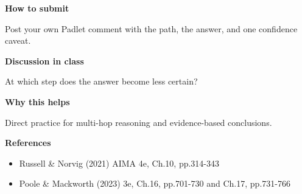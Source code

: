 \documentclass[11pt]{article}
\begin{document}
\begin{tcolorbox}[colback=white,colframe=MidnightBlue,title={Q2 Structured Problem},fonttitle=\bfseries,breakable]
{\large\bfseries\color{MidnightBlue} How to submit}\par\medskip
Post your own Padlet comment with the path, the answer, and one confidence caveat.

{\large\bfseries\color{MidnightBlue} Discussion in class}\par\medskip
At which step does the answer become less certain?

{\large\bfseries\color{MidnightBlue} Why this helps}\par\medskip
Direct practice for multi-hop reasoning and evidence-based conclusions.

{\large\bfseries\color{MidnightBlue} References}\par\medskip
\begin{itemize}\item Russell \& Norvig (2021) AIMA 4e, Ch.10, pp.314-343
\item Poole \& Mackworth (2023) 3e, Ch.16, pp.701-730 and Ch.17, pp.731-766\end{itemize}
\end{tcolorbox}
\end{document}

